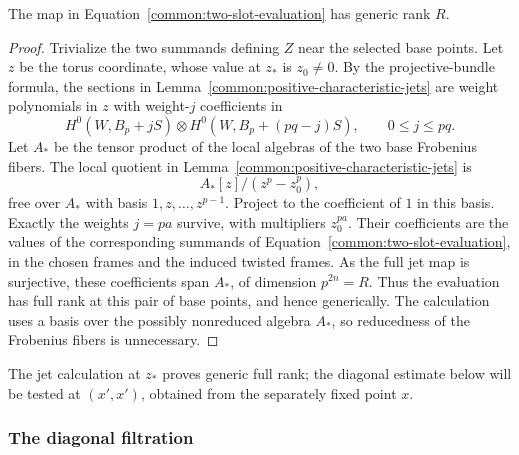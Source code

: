 \begin{lemma}\label{common:generic-rank}
The map in Equation~\eqref{common:two-slot-evaluation} has generic rank $R$.
\end{lemma}

\begin{proof}
Trivialize the two summands defining $Z$ near the selected base
points.  Let $z$ be the torus coordinate, whose value at $z_*$ is
$z_0\ne0$.  By the projective-bundle formula, the sections in
Lemma~\ref{common:positive-characteristic-jets} are weight polynomials in $z$
with weight-$j$ coefficients in
\[
 H^0(W,B_p+jS)\otimes
 H^0(W,B_p+(pq-j)S),\qquad 0\le j\le pq.
\]
Let $A_*$ be the tensor product of the local algebras of the two
base Frobenius fibers.  The local quotient in
Lemma~\ref{common:positive-characteristic-jets} is
\[
 A_*[z]/(z^p-z_0^p),
\]
free over $A_*$ with basis $1,z,\ldots,z^{p-1}$.  Project to the
coefficient of $1$ in this basis.  Exactly the weights $j=pa$
survive, with multipliers $z_0^{pa}$.  Their coefficients are the
values of the corresponding summands of
Equation~\eqref{common:two-slot-evaluation}, in the chosen frames and the induced
twisted frames.  As the full jet map is surjective, these coefficients
span $A_*$, of dimension $p^{2n}=R$.  Thus the evaluation has full
rank at this pair of base points, and hence generically.  The
calculation uses a basis over the possibly nonreduced algebra $A_*$,
so reducedness of the Frobenius fibers is unnecessary.
\end{proof}

The jet calculation at $z_*$ proves generic full rank; the diagonal
estimate below will be tested at $(x',x')$, obtained from the
separately fixed point $x$.

\subsubsection{The diagonal filtration}

